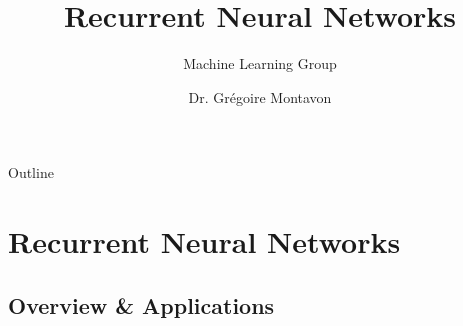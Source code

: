 \documentclass[Nike]{tuberlinbeamer}
\title{Recurrent Neural Networks}
\subtitle{Machine Learning Group}
\author[SS.2018 Deep Neural Networks]{Dr. Gr\'egoire Montavon}
\institute{Technische Universität Berlin}
\begin{document}
\begin{frame}
\maketitle
\end{frame}


\begin{frame}{Outline}
\tableofcontents
\end{frame}

\section{Recurrent Neural Networks}
\subsection{Overview \& Applications}
\end{document}
